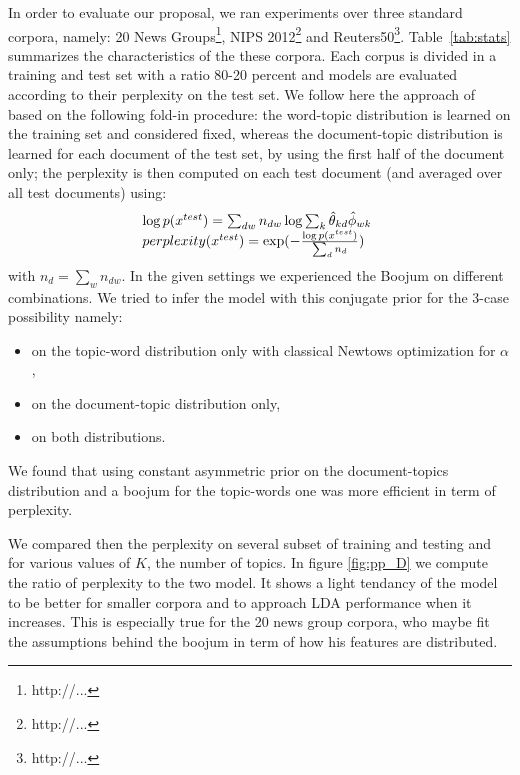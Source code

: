 In order to evaluate our proposal, we ran experiments over three standard corpora, namely: 20 News Groups\footnote{http://...}, NIPS 2012\footnote{http://...} and Reuters50\footnote{http://...}. Table~\ref{tab:stats} summarizes the characteristics of the these corpora. Each corpus is divided in a training and test set with a ratio 80-20 percent and models are evaluated according to their perplexity on the test set. We follow here the  approach of \cite{asuncion_smoothing_2009} based on the following fold-in procedure: the word-topic distribution is learned on the training set and considered fixed, whereas the document-topic distribution is learned for each document of the test set, by using the first half of the document only; the perplexity is then computed on each test document (and averaged over all test documents) using:
%
\[
\begin{array}{l@{\hspace{.3cm}}l}
\log p(x^{test}) = \sum_{dw} n_{dw} \log \sum_k \hat{\theta}_{kd} \hat{\phi}_{wk} \\
perplexity(x^{test}) = \exp(- \frac{\log p(x^{test})}{\sum_d n_d})
\end{array}
\]
%
with $n_d = \sum_w n_{dw}$. 
In the given settings we experienced the Boojum on different combinations. We tried to infer the model with this conjugate prior for the 3-case possibility namely:
\begin{itemize}
\item on the topic-word distribution only with classical Newtows optimization for $\alpha$,
\item on the document-topic distribution only,
\item on both distributions. 
\end{itemize}
We found that using constant asymmetric prior on the document-topics distribution and a boojum for the topic-words one was more efficient in term of perplexity.

We compared then the perplexity on several subset of training and testing and for various values of $K$, the number of topics. In figure \ref{fig:pp_D} we compute the ratio of perplexity to the two model. It shows a light tendancy of the model to be better for smaller corpora and to approach LDA performance when it increases. This is especially true for the 20 news group corpora, who maybe fit the assumptions behind the boojum in term of how his features are distributed. 

